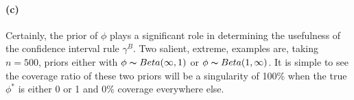 \documentclass[11pt, letterpaper]{article}
\begin{document}
\paragraph{(c)}
Certainly, the prior of $\phi$ plays a significant role in determining the usefulness of the confidence interval rule $\gamma^B$. Two salient, extreme, examples are, taking $n=500$, priors either with $\phi \thicksim Beta(\infty, 1)$ or $\phi \thicksim Beta(1, \infty)$. It is simple to see the coverage ratio of these two priors will be a singularity of 100\% when the true $\phi^*$ is either 0 or 1 and 0\% coverage everywhere else.
\end{document}
